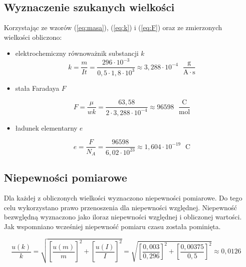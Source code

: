 \documentclass [a4paper,11pt]{article}
\begin{document}
	\subsection{Wyznaczenie szukanych wielkości}
		Korzystając ze wzorów (\ref{eq:masa}), (\ref{eq:k}) i (\ref{eq:F}) oraz ze zmierzonych wielkości obliczono:
	\begin{itemize}
		
		\item elektrochemiczny równoważnik substancji $k$
		\begin{equation}
		k = \frac{m}{I t} = \frac{296 \cdot 10^{-3}}{0,5 \cdot 1,8 \cdot 10^3} \approx 3,288\cdot 10^{-4}\text{ }\mathrm{\frac{g}{A \cdot s}}
		\label{k_obliczone} 
		\end{equation}
		
		\item stała Faradaya $F$
		
		\begin{equation}
		F = \frac{\mu}{w k} = \frac{63,58 }{2 \cdot 3,288 \cdot 10^{-4}} \approx 96598 \text{ } \mathrm{\frac{C}{mol}}
		\label{F_obliczone} 
		\end{equation}
		
		\item ładunek elementarny $e$
		
		\begin{equation}
		e = \frac{F}{N_A} = \frac{96598 }{6,02 \cdot 10^{23}} \approx 1,604 \cdot 10^{-19}   \text{ }\mathrm{  C} 
		\label{e_obliczone} 
		\end{equation}
	\end{itemize}
 
 	
 	\subsection{Niepewności pomiarowe }
 	

 	Dla każdej z obliczonych wielkości wyznaczono niepewności pomiarowe. Do tego celu wykorzystano prawo przenoszenia dla niepewności względnej. Niepewność bezwględną wyznaczono jako iloraz niepewności względnej i obliczonej wartości.
 	Jak wspomniano wcześniej niepewność pomiaru czasu została pominięta.

 	\begin{equation}
 	\frac{u(k)}{k} = \sqrt{\left[\frac{u(m)}{m} \right]^2 + \left[\frac{u(I)}{I} \right]^2 } = \sqrt{\left[\frac{ 0,003}{0,296} \right]^2 + \left[\frac{0,00375}{0,5} \right]^2 } \approx 0,0126
 	\end{equation}
 	
\end{document}
